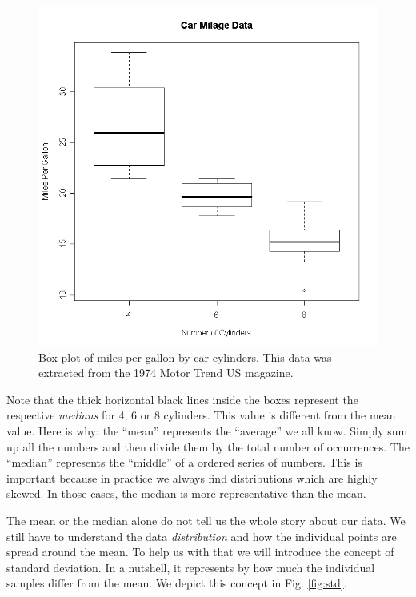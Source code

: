 \begin{figure}[h]
	\begin{center}
			\includegraphics[scale=0.3]{Parts/basics/milleagech2}
	\end{center}
	\caption{Box-plot of miles per gallon by car cylinders. This data was extracted from the 1974 Motor Trend US magazine.}
	\label{fig:boxplot}
\end{figure} 

Note that the thick horizontal black lines inside the boxes represent the respective \textit{medians} for 4, 6 or 8 cylinders. This value is different from the mean value. Here is why: the ``mean'' represents the ``average'' we all know. Simply sum up all the numbers and then divide them by the total number of occurrences. The ``median'' represents the ``middle'' of a ordered series of numbers. This is important because in practice we always find distributions which are highly skewed. In those cases, the median is more representative than the mean.

The mean or the median alone do not tell us the whole story about our data. We still have to understand the data \textit{distribution} and how the individual points are spread around the mean. To help us with that we will introduce the concept of standard deviation. In a nutshell, it represents by how much the individual samples differ from the mean. We depict this concept in Fig. \ref{fig:std}.

